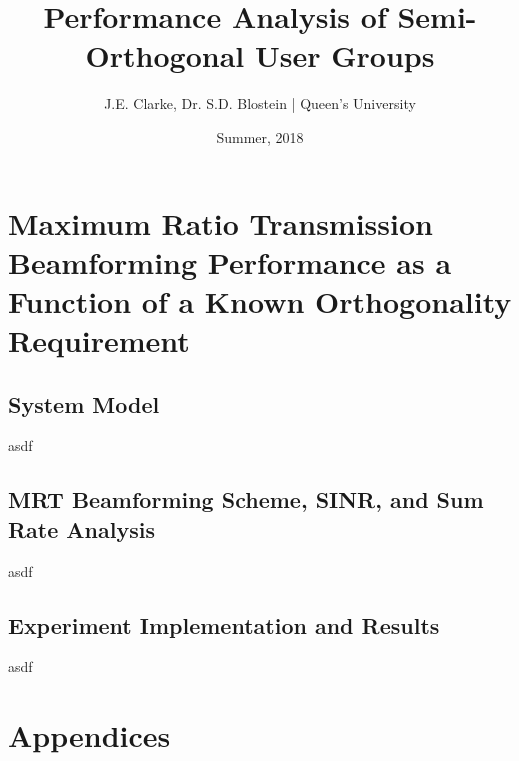 \documentclass[11pt]{article}
\title{Performance Analysis of Semi-Orthogonal User Groups}
\author{J.E. Clarke, Dr. S.D. Blostein | Queen's University}
\date{Summer, 2018}
\begin{document}
	\maketitle
	\newpage
    \section{Maximum Ratio Transmission Beamforming Performance as a Function of a Known Orthogonality Requirement}
    	\subsection{System Model}
    	asdf
        \subsection{MRT Beamforming Scheme, SINR, and Sum Rate Analysis}
        asdf
        \subsection{Experiment Implementation and Results}
        asdf

    \newpage
	\section{Appendices}
    \newpage	
 	\begingroup
 		\renewcommand{\section}[2]{}%
 		
% 		
 	\endgroup
\end{document}
